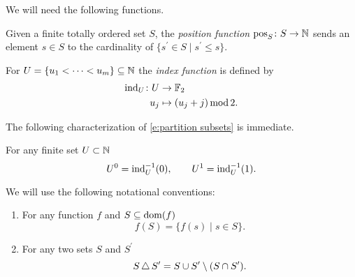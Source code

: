 We will need the following functions.

\begin{definition} \label{d:position function}
	Given a finite totally ordered set $S$, the \textit{position function} $\operatorname{pos}_S \colon S \to \mathbb{N}$ sends an element $s \in S$ to the cardinality of $\{s^\prime \in S \mid s^\prime \leq s\}$.
\end{definition}

\begin{definition} \label{d:index function}
	For $U = \{u_1 < \cdots < u_m\} \subseteq \mathbb{N}$ the \textit{index function} is defined by
	\[
	\begin{split}
	\mathrm{ind}_U \colon U & \to {\mathbb{F}_2} \\
	u_j & \mapsto (u_j + j) \operatorname{mod} 2.
	\end{split}
	\]
\end{definition}

The following characterization of \eqref{e:partition subsets} is immediate.

\begin{lemma} \label{l:partition via index function}
	For any finite set $U \subset \mathbb{N}$
	\[
	U^0 = \mathrm{ind}_U^{-1}(0), \qquad
	U^1 = \mathrm{ind}_U^{-1}(1).
	\]
\end{lemma}

\begin{notation}
	We will use the following notational conventions:
	\begin{enumerate}
		\item For any function $f$ and $S \subseteq \operatorname{dom}(f)$
		\[
		f(S) = \{ f(s) \mid s \in S\}.
		\]
		\item For any two sets $S$ and $S^\prime$
		\[
		S \operatorname{\triangle} S^\prime = S \cup S^\prime \setminus (S \cap S^\prime).
		\]
	\end{enumerate}
\end{notation}

